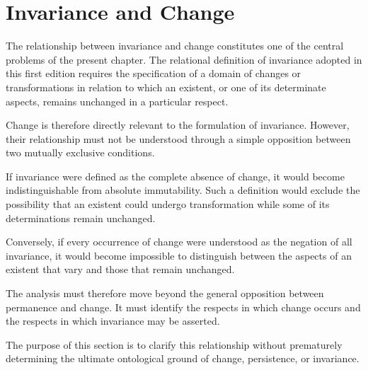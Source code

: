 

\section{Invariance and Change}
\label{sec:invariance-and-change}


The relationship between invariance and change constitutes
one of the central problems of the present chapter. The
relational definition of invariance adopted in this first
edition requires the specification of a domain of changes
or transformations in relation to which an existent, or
one of its determinate aspects, remains unchanged in a
particular respect.

Change is therefore directly relevant to the formulation
of invariance. However, their relationship must not be
understood through a simple opposition between two
mutually exclusive conditions.

If invariance were defined as the complete absence of
change, it would become indistinguishable from absolute
immutability. Such a definition would exclude the
possibility that an existent could undergo transformation
while some of its determinations remain unchanged.

Conversely, if every occurrence of change were understood
as the negation of all invariance, it would become
impossible to distinguish between the aspects of an
existent that vary and those that remain unchanged.

The analysis must therefore move beyond the general
opposition between permanence and change. It must
identify the respects in which change occurs and
the respects in which invariance may be asserted.

The purpose of this section is to clarify this relationship
without prematurely determining the ultimate ontological
ground of change, persistence, or invariance.


